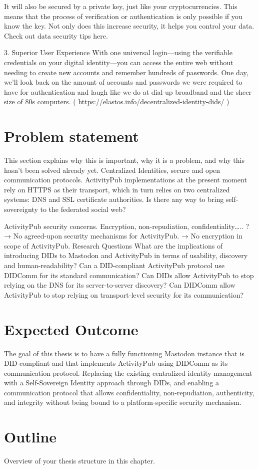 It will also be secured by a private key, just like your cryptocurrencies. This means that the process of verification or authentication is only possible if you know the key. Not only does this increase security, it helps you control your data. Check out data security tips here.

3. Superior User Experience
With one universal login—using the verifiable credentials on your digital identity—you can access the entire web without needing to create new accounts and remember hundreds of passwords. One day, we’ll look back on the amount of accounts and passwords we were required to have for authentication and laugh like we do at dial-up broadband and the sheer size of 80s computers.
( https://elastos.info/decentralized-identity-dids/ )
 
\section{Problem statement}
 
This section explains why this is important, why it is a problem, and why this hasn't been solved already yet. Centralized Identities, secure and open communication protocols. 
ActivityPub implementations at the present moment rely on HTTPS as their transport, which in turn relies on two centralized systems: DNS and SSL certificate authorities. Is there any way to bring self-sovereignty to the federated social web? \cite{webber_sporny_2017}
 
ActivityPub security concerns. Encryption, non-repudiation, confidentiality….. ? 
→ No agreed-upon security mechanisms for ActivityPub. 
→ No encryption in scope of ActivityPub.
Research Questions
What are the implications of introducing DIDs to Mastodon and ActivityPub in terms of usability, discovery and human-readability?
Can a DID-compliant ActivityPub protocol use DIDComm for its standard communication?
Can DIDs allow ActivityPub to stop relying on the DNS for its server-to-server discovery?
Can DIDComm allow ActivityPub to stop relying on transport-level security for its communication?

\section{Expected Outcome}
The goal of this thesis is to have a fully functioning Mastodon instance that is DID-compliant and that implements ActivityPub using DIDComm as its communication protocol. 
Replacing the existing centralized identity management with a Self-Sovereign Identity approach through DIDs, and enabling a communication protocol that allows confidentiality, non-repudiation, authenticity, and integrity without being bound to a platform-specific security mechanism.
 
\section{Outline}
Overview of your thesis structure in this chapter.
